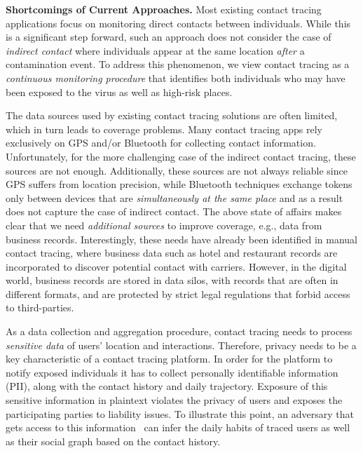 \documentclass[11pt,dvipdfmx]{article}  %
\begin{document}
\textbf{Shortcomings of Current Approaches.} Most existing contact tracing applications focus on monitoring direct contacts between individuals. 
While this is a significant step forward, such an  approach does not consider the case of \emph{indirect contact} where individuals appear at the same location \emph{after} a contamination event. To address this phenomenon, we view contact tracing as a \emph{continuous monitoring procedure} that identifies both individuals who may have been exposed to the virus as well as high-risk places. %

The data sources used by existing contact tracing solutions are often limited, which in turn leads to coverage problems. Many contact tracing apps rely exclusively on GPS and/or Bluetooth for collecting contact information. Unfortunately, for the more challenging case of the indirect contact tracing, these sources are not enough. Additionally, these sources are not always reliable since GPS suffers from location precision, while Bluetooth techniques exchange tokens only between devices that are \emph{simultaneously at the same place} and as a result does not capture the case of indirect contact. The above state of affairs makes clear that we need \emph{additional sources} to improve coverage, e.g., data from business records. Interestingly, these needs have already been identified in manual contact tracing, where business data such as hotel and restaurant records are incorporated to discover potential contact with carriers. However, in the digital world, business records are stored in data silos, with records that are often in different formats, and are protected by strict legal regulations that forbid access to third-parties.

As a data collection and aggregation procedure, contact tracing needs to process \emph{sensitive data} of users' location and interactions. 
Therefore, privacy needs to be a key characteristic of a contact tracing platform. 
In order for the platform to notify exposed individuals it has to collect personally identifiable information (PII), along with the contact history and daily trajectory.  Exposure of this sensitive information in plaintext violates the privacy of users and exposes the participating parties to liability issues. To illustrate this point, an adversary that gets access to this information~\cite{corona-sniffer} can infer the daily habits of traced users as well as their social graph based on the contact history. 
\end{document}
